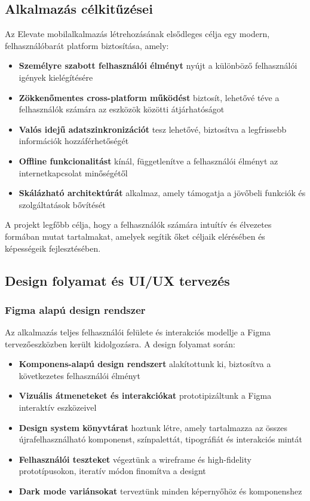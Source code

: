 \documentclass[12pt]{report}
\begin{document}
\subsection{Alkalmazás célkitűzései}
Az Elevate mobilalkalmazás létrehozásának elsődleges célja egy modern, felhasználóbarát platform biztosítása, amely:
\begin{itemize}
    \item \textbf{Személyre szabott felhasználói élményt} nyújt a különböző felhasználói igények kielégítésére
    \item \textbf{Zökkenőmentes cross-platform működést} biztosít, lehetővé téve a felhasználók számára az eszközök közötti átjárhatóságot
    \item \textbf{Valós idejű adatszinkronizációt} tesz lehetővé, biztosítva a legfrissebb információk hozzáférhetőségét
    \item \textbf{Offline funkcionalitást} kínál, függetlenítve a felhasználói élményt az internetkapcsolat minőségétől
    \item \textbf{Skálázható architektúrát} alkalmaz, amely támogatja a jövőbeli funkciók és szolgáltatások bővítését
\end{itemize}

A projekt legfőbb célja, hogy a felhasználók számára intuítív és élvezetes formában mutat tartalmakat, amelyek segítik őket céljaik elérésében és képességeik fejlesztésében.

\subsection{Design folyamat és UI/UX tervezés}
\subsubsection{Figma alapú design rendszer}
Az alkalmazás teljes felhasználói felülete és interakciós modellje a Figma tervezőeszközben került kidolgozásra. A design folyamat során:
\begin{itemize}
    \item \textbf{Komponens-alapú design rendszert} alakítottunk ki, biztosítva a következetes felhasználói élményt
    \item \textbf{Vizuális átmeneteket és interakciókat} prototipizáltunk a Figma interaktív eszközeivel
    \item \textbf{Design system könyvtárat} hoztunk létre, amely tartalmazza az összes újrafelhasználható komponenst, színpalettát, tipográfiát és interakciós mintát
    \item \textbf{Felhasználói teszteket} végeztünk a wireframe és high-fidelity prototípusokon, iteratív módon finomítva a designt
    \item \textbf{Dark mode variánsokat} terveztünk minden képernyőhöz és komponenshez
\end{itemize}
\end{document}

